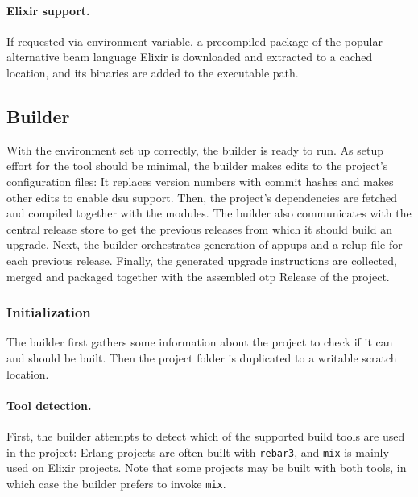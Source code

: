 \paragraph{Elixir support.} If requested via environment variable, a precompiled package of the popular alternative \acrshort{beam} language Elixir is downloaded and extracted to a cached location, and its binaries are added to the executable path.

\cleardoublepage
\subsection{Builder}

With the environment set up correctly, the builder is ready to run. As setup effort for the tool should be minimal, the builder makes edits to the project's configuration files: It replaces version numbers with commit hashes and makes other edits to enable \acrshort{dsu} support. Then, the project's dependencies are fetched and compiled together with the modules. The builder also communicates with the central release store to get the previous releases from which it should build an upgrade. Next, the builder orchestrates generation of \acrshort{appup}s and a \acrshort{relup} file for each previous release. Finally, the generated upgrade instructions are collected, merged and packaged together with the assembled \acrshort{otp} Release of the project.

\subsubsection{Initialization}

The builder first gathers some information about the project to check if it can and should be built. Then the project folder is duplicated to a writable scratch location.

\paragraph{Tool detection.} First, the builder attempts to detect which of the supported build tools are used in the project: Erlang projects are often built with \lstinline|rebar3|, and \lstinline|mix| is mainly used on Elixir projects. Note that some projects may be built with both tools, in which case the builder prefers to invoke \lstinline|mix|.

